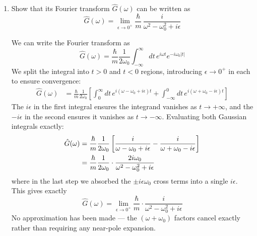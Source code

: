 \begin{enumerate}[label=\alph*), resume]
        \item Show that its Fourier transform $\hat{G}(\omega)$ can be written as
        \begin{equation}
            \hat{G}(\omega) = \lim_{\epsilon \to 0^+} \frac{\hbar}{m}\,\frac{i}{\omega^2 - \omega_0^2 + i\epsilon}
        \end{equation}
        \begin{solution}
            We can write the Fourier transform as
    \begin{equation}
        \hat{G}(\omega) = \frac{\hbar}{m}\frac{1}{2\omega_0}
        \int_{-\infty}^{\infty} dt\, e^{i\omega t}e^{-i\omega_0|t|}
    \end{equation}
    We split the integral into $t>0$ and $t<0$ regions, introducing $\epsilon\to 0^+$ in each to ensure convergence:
    \begin{align}
        \hat{G}(\omega) 
        &= \frac{\hbar}{m}\frac{1}{2\omega_0}\left[
           \int_0^\infty dt\, e^{i(\omega-\omega_0+i\epsilon)t} 
           + \int_{-\infty}^0 dt\, e^{i(\omega+\omega_0-i\epsilon)t}
           \right]
    \end{align}
    The $i\epsilon$ in the first integral ensures the integrand vanishes as $t\to+\infty$, and the $-i\epsilon$ in the second ensures it vanishes as $t\to-\infty$. Evaluating both Gaussian integrals exactly:
    \begin{align}
        \hat{G}(\omega) 
        &= \frac{\hbar}{m}\frac{1}{2\omega_0}\left[
           \frac{i}{\omega-\omega_0+i\epsilon} 
           - \frac{i}{\omega+\omega_0-i\epsilon}
           \right] \notag\\
        &= \frac{\hbar}{m}\frac{1}{2\omega_0}\cdot
           \frac{2i\omega_0}{\omega^2-\omega_0^2+i\epsilon}
    \end{align}
    where in the last step we absorbed the $\pm i\epsilon\omega_0$ cross terms into a single $i\epsilon$. This gives exactly
    \begin{equation}
        \hat{G}(\omega) = \lim_{\epsilon\to 0^+}\frac{\hbar}{m}
        \cdot\frac{i}{\omega^2 - \omega_0^2 + i\epsilon}
    \end{equation}
    No approximation has been made — the $(\omega+\omega_0)$ factors cancel exactly rather than requiring any near-pole expansion.
            
        \end{solution}
    
    \end{enumerate}
    
